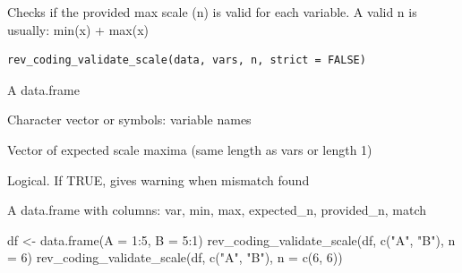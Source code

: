 \documentclass[a4paper]{book}
\begin{document}
%
\begin{Description}
Checks if the provided max scale (n) is valid for each variable.
A valid n is usually: min(x) + max(x)
\end{Description}
%
\begin{Usage}
\begin{verbatim}
rev_coding_validate_scale(data, vars, n, strict = FALSE)
\end{verbatim}
\end{Usage}
%
\begin{Arguments}
\begin{ldescription}
\item[\code{data}] A data.frame

\item[\code{vars}] Character vector or symbols: variable names

\item[\code{n}] Vector of expected scale maxima (same length as vars or length 1)

\item[\code{strict}] Logical. If TRUE, gives warning when mismatch found
\end{ldescription}
\end{Arguments}
%
\begin{Value}
A data.frame with columns: var, min, max, expected\_n, provided\_n, match
\end{Value}
%
\begin{Examples}
\begin{ExampleCode}
df <- data.frame(A = 1:5, B = 5:1)
rev_coding_validate_scale(df, c("A", "B"), n = 6)
rev_coding_validate_scale(df, c("A", "B"), n = c(6, 6))
\end{ExampleCode}
\end{Examples}
\end{document}
